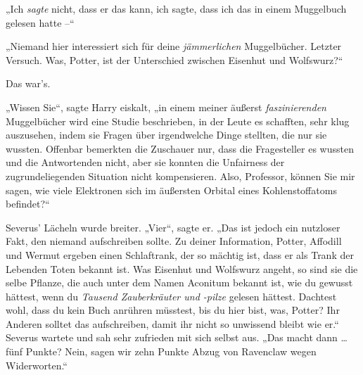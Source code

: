 „Ich \emph{sagte} nicht, dass er das kann, ich sagte, dass ich das in einem Muggelbuch gelesen hatte –“ 

„Niemand hier interessiert sich für deine \emph{jämmerlichen} Muggelbücher. Letzter Versuch. Was, Potter, ist der Unterschied zwischen Eisenhut und Wolfswurz?“ 

Das war’s. 

„Wissen Sie“, sagte Harry eiskalt, „in einem meiner äußerst \emph{faszinierenden} Muggelbücher wird eine Studie beschrieben, in der Leute es schafften, sehr klug auszusehen, indem sie Fragen über irgendwelche Dinge stellten, die nur sie wussten. Offenbar bemerkten die Zuschauer nur, dass die Fragesteller es wussten und die Antwortenden nicht, aber sie konnten die Unfairness der zugrundeliegenden Situation nicht kompensieren. Also, Professor, können Sie mir sagen, wie viele Elektronen sich im äußersten Orbital eines Kohlenstoffatoms befindet?“ 

Severus’ Lächeln wurde breiter. „Vier“, sagte er. „Das ist jedoch ein nutzloser Fakt, den niemand aufschreiben sollte. Zu deiner Information, Potter, Affodill und Wermut ergeben einen Schlaftrank, der so mächtig ist, dass er als Trank der Lebenden Toten bekannt ist. Was Eisenhut und Wolfswurz angeht, so sind sie die selbe Pflanze, die auch unter dem Namen Aconitum bekannt ist, wie du gewusst hättest, wenn du \emph{Tausend Zauberkräuter und -pilze} gelesen hättest. Dachtest wohl, dass du kein Buch anrühren müsstest, bis du hier bist, was, Potter? Ihr Anderen solltet das aufschreiben, damit ihr nicht so unwissend bleibt wie er.“ Severus wartete und sah sehr zufrieden mit sich selbst aus. „Das macht dann … fünf Punkte? Nein, sagen wir zehn Punkte Abzug von Ravenclaw wegen Widerworten.“ 

